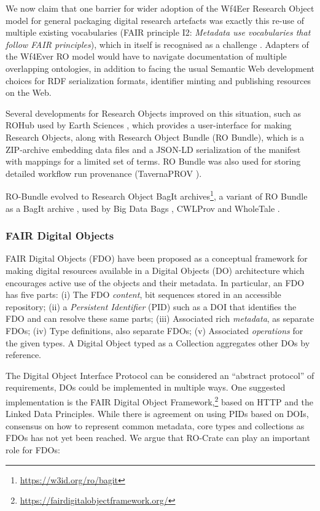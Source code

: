 We now claim that one barrier for wider adoption of the Wf4Eer Research
Object model for general packaging digital research artefacts was
exactly this re-use of multiple existing vocabularies (FAIR principle
I2: \emph{Metadata use vocabularies that follow FAIR principles}), which
in itself is recognised as a challenge
\cite{Katsumi 2016}. Adapters
of the Wf4Ever RO model would have to navigate documentation of multiple
overlapping ontologies, in addition to facing the usual Semantic Web
development choices for RDF serialization formats, identifier minting
and publishing resources on the Web.

Several developments for Research Objects improved on this situation,
such as ROHub used by Earth Sciences
\cite{Garcia-Silva 2019}, which provides a
user-interface for making Research Objects, along with Research Object
Bundle \cite{Soiland-Reyes 2014} (RO
Bundle), which is a ZIP-archive embedding data files and a JSON-LD
serialization of the manifest with mappings for a limited set of terms.
RO Bundle was also used for storing detailed workflow run provenance
(TavernaPROV
\cite{Soiland-Reyes 2016}).

RO-Bundle evolved to Research Object
BagIt archives\footnote{\url{https://w3id.org/ro/bagit}}, a variant of RO Bundle as a BagIt archive
\cite{Kunze 2018}, used by Big Data Bags
\cite{Chard 2016},
CWLProv \cite{Khan 2019} and
WholeTale \cite{Chard 2020,Chard 2019}.

\subsubsection{FAIR Digital Objects}\label{ch5:fair-digital-objects}

FAIR Digital Objects (FDO)
\cite{De Smedt 2020} have been
proposed as a conceptual framework for making digital resources
available in a Digital Objects (DO) architecture which encourages active
use of the objects and their metadata. In particular, an FDO has five
parts: (i) The FDO \emph{content}, bit sequences stored in an accessible
repository; (ii) a \emph{Persistent Identifier} (PID) such as a DOI that
identifies the FDO and can resolve these same parts; (iii) Associated
rich \emph{metadata}, as separate FDOs; (iv) Type definitions, also
separate FDOs; (v) Associated \emph{operations} for the given types. A
Digital Object typed as a Collection aggregates other DOs by reference.

The Digital Object Interface Protocol \cite{DONA 2018}
can be considered an ``abstract protocol'' of requirements, DOs could be
implemented in multiple ways. One suggested implementation is the 
FAIR Digital Object
Framework,\footnote{\url{https://fairdigitalobjectframework.org/}} based on HTTP and the Linked Data Principles. While there is
agreement on using PIDs based on DOIs, consensus on how to represent
common metadata, core types and collections as FDOs has not yet been
reached. We argue that RO-Crate can play an important role for FDOs:

